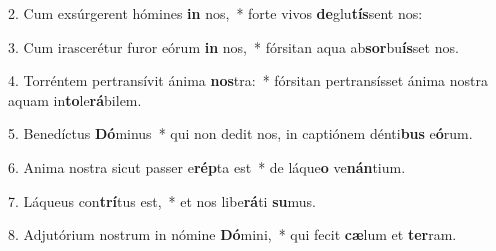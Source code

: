 2. Cum exsúrgerent hómines \textbf{in} nos,~*  forte vivos \textbf{de}glu\textbf{tís}sent nos:\

3. Cum irascerétur furor eórum \textbf{in} nos,~*  fórsitan aqua ab\textbf{sor}bu\textbf{ís}set nos.\

4. Torréntem pertransívit ánima \textbf{nos}tra:~*  fórsitan pertransísset ánima nostra aquam in\textbf{to}le\textbf{rá}bilem.\

5. Benedíctus \textbf{Dó}minus~*  qui non dedit nos, in captiónem dénti\textbf{bus} e\textbf{ó}rum.\

6. Anima nostra sicut passer e\textbf{rép}ta est~*  de láque\textbf{o} ve\textbf{nán}tium.\

7. Láqueus con\textbf{trí}tus est,~*  et nos libe\textbf{rá}ti \textbf{su}mus.\

8. Adjutórium nostrum in nómine \textbf{Dó}mini,~*  qui fecit \textbf{cæ}lum et \textbf{ter}ram.\

